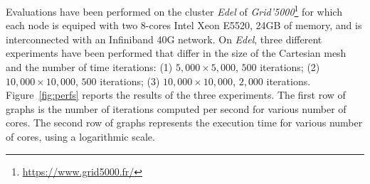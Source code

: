 Evaluations have been performed on the cluster \emph{Edel} of \emph{Grid'5000}\footnote{\url{https://www.grid5000.fr/}} 
for which each node is equiped with two 8-cores Intel Xeon E5520, 24GB of memory, and is interconnected with an Infiniband 40G network. 
On \emph{Edel}, three different experiments have been performed that differ in the size of the Cartesian mesh and the number of time iterations: (1) $5,000 \times 5,000$, $500$ iterations; (2) $10,000 \times 10,000$, $500$ iterations; (3) $10,000 \times 10,000$, $2,000$ iterations.
Figure~\ref{fig:perfs} reports the results of the three experiments. The first row of graphs is the number of iterations computed per second for various number of cores. The second row of graphs represents the execution time for various number of cores, using a logarithmic scale.

